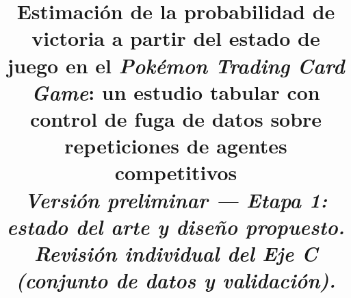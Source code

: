\documentclass[conference]{IEEEtran}
\begin{document}
\title{Estimaci\'on de la probabilidad de victoria a partir del estado de
juego en el \emph{Pok\'emon Trading Card Game}: un estudio tabular con
control de fuga de datos sobre repeticiones de agentes competitivos\\
{\footnotesize \textit{Versi\'on preliminar --- Etapa 1: estado del arte y
dise\~no propuesto. Revisi\'on individual del Eje C (conjunto de datos y
validaci\'on).}}}

\author{
}

\maketitle
\end{document}
